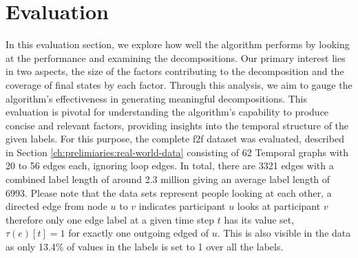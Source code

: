
\chapter{Evaluation}
\label{ch:Evaluation}
In this evaluation section, we explore how well the algorithm performs by looking at the performance and examining the decompositions.
Our primary interest lies in two aspects, the size of the factors contributing to the decomposition and the coverage of final states by each factor.
Through this analysis, we aim to gauge the algorithm's effectiveness in generating meaningful decompositions.
This evaluation is pivotal for understanding the algorithm's capability to produce concise and relevant factors, providing insights into the temporal structure of the given labels.
For this purpose, the complete f2f dataset was evaluated, described in Section \ref{ch:prelimiaries:real-world-data} consisting of 62 Temporal graphs with 20 to 56 edges each, ignoring loop edges.
In total, there are 3321 edges with a combined label length of around 2.3 million giving an average label length of 6993.
Please note that the data sets represent people looking at each other, a directed edge from node $u$ to $v$ indicates participant $u$ looks at participant $v$ therefore only one edge label at a given time step $t$ has its value set, $\tau(e)[t] = 1$ for exactly one outgoing edged of $u$.
This is also visible in the data as only 13.4\% of values in the labels is set to 1 over all the labels.


